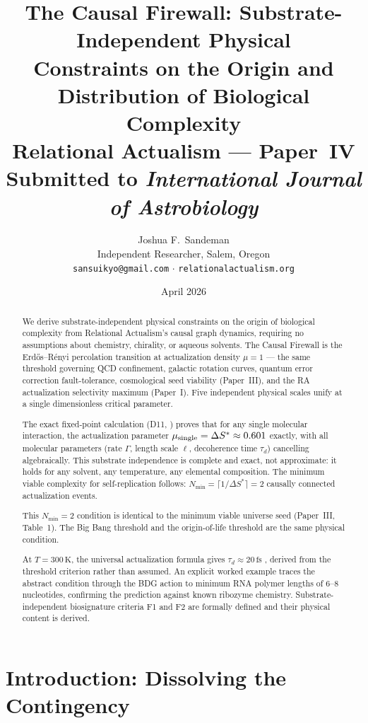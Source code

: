 \documentclass[12pt,a4paper]{article}
\title{\textbf{The Causal Firewall: Substrate-Independent Physical\\
Constraints on the Origin and Distribution of Biological Complexity}\\[0.5em]
\large\normalfont Relational Actualism --- Paper~IV\\
\normalsize Submitted to \textit{International Journal of Astrobiology}}
\author{Joshua F.~Sandeman\\\small Independent Researcher, Salem, Oregon\\\small \texttt{sansuikyo@gmail.com} $\cdot$ \texttt{relationalactualism.org}}
\date{April 2026}
\begin{document}
\maketitle

\begin{abstract}
We derive substrate-independent physical constraints on the origin of biological complexity from Relational Actualism's causal graph dynamics, requiring no assumptions about chemistry, chirality, or aqueous solvents.  The Causal Firewall is the Erd\H{o}s--R\'enyi percolation transition at actualization density $\mu=1$ --- the same threshold governing QCD confinement, galactic rotation curves, quantum error correction fault-tolerance, cosmological seed viability (Paper~III), and the RA actualization selectivity maximum (Paper~I).  Five independent physical scales unify at a single dimensionless critical parameter.

The exact fixed-point calculation (D11, \statusDR) proves that for any single molecular interaction, the actualization parameter $\mu_{\rm single}=\Delta S^*\approx0.601$ exactly, with all molecular parameters (rate $\Gamma$, length scale $\ell$, decoherence time $\tau_d$) cancelling algebraically.  This substrate independence is complete and exact, not approximate: it holds for any solvent, any temperature, any elemental composition.  The minimum viable complexity for self-replication follows: $N_{\min}=\lceil1/\Delta S^*\rceil=2$ causally connected actualization events.

This $N_{\min}=2$ condition is identical to the minimum viable universe seed (Paper~III, Table~1).  The Big Bang threshold and the origin-of-life threshold are the same physical condition.

At $T=300\,\mathrm{K}$, the universal actualization formula gives $\tau_d\approx20\,\mathrm{fs}$ \statusDR, derived from the threshold criterion rather than assumed.  An explicit worked example traces the abstract condition through the BDG action to minimum RNA polymer lengths of $6$--$8$ nucleotides, confirming the prediction against known ribozyme chemistry.  Substrate-independent biosignature criteria F1 and F2 are formally defined and their physical content is derived.
\end{abstract}

\tableofcontents\bigskip

\section{Introduction: Dissolving the Contingency}\label{sec:intro}
\end{document}
